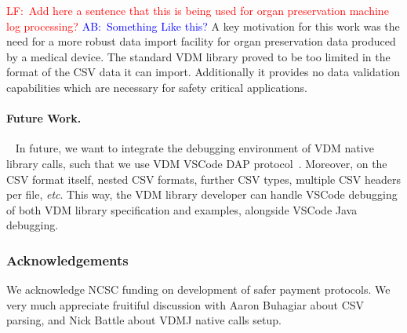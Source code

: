 \documentclass[runningheads,a4paper]{llncs}
\newcommand{\abcomment}[1]{{\scriptsize\textcolor{blue}{AB:~#1}}}  %
\newcommand{\lfcomment}[1]{{\scriptsize\textcolor{red}{LF:~#1}}}  %
\begin{document}
\lfcomment{Add here a sentence that this is being used for organ preservation machine log processing?}
\abcomment{Something Like this?}
A key motivation for this work was the need for a more robust data import facility for organ preservation data produced by a medical device. The standard VDM library proved to be too limited in the format of the CSV data it can import. Additionally it provides no data validation capabilities which are necessary for safety critical applications. 


\paragraph*{Future Work.}~
%
In future, we want to integrate the debugging environment of VDM native library calls, such that we use VDM VSCode DAP protocol~\cite{AdvancedVSCodePaper}. Moreover, on the CSV format itself, nested CSV formats, further CSV types, multiple CSV headers per file, \textit{etc}. This way, the VDM library developer can handle VSCode debugging of both VDM library specification and examples, alongside VSCode Java debugging. 

\subsubsection*{Acknowledgements}
We acknowledge NCSC funding on development of safer payment protocols. We very much appreciate fruitiful discussion with Aaron Buhagiar about CSV parsing, and Nick Battle about VDMJ native calls setup. 




\end{document}
